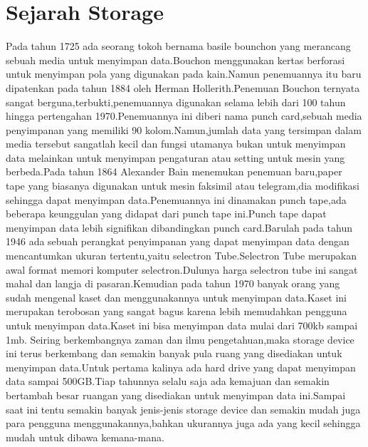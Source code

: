 \section{Sejarah Storage}
Pada tahun 1725 ada seorang tokoh bernama basile bounchon yang merancang sebuah media untuk menyimpan data.Bouchon menggunakan kertas berforasi untuk menyimpan pola yang digunakan pada kain.Namun penemuannya itu baru dipatenkan pada tahun 1884 oleh Herman Hollerith.Penemuan Bouchon ternyata sangat berguna,terbukti,penemuannya digunakan selama lebih dari 100 tahun hingga pertengahan 1970.Penemuannya ini diberi nama punch card,sebuah media penyimpanan yang memiliki 90 kolom.Namun,jumlah data yang tersimpan dalam media tersebut sangatlah kecil dan fungsi utamanya bukan untuk menyimpan data melainkan untuk menyimpan pengaturan atau setting untuk mesin yang berbeda.Pada tahun 1864 Alexander Bain menemukan penemuan baru,paper tape yang biasanya digunakan untuk mesin faksimil atau telegram,dia modifikasi sehingga dapat menyimpan data.Penemuannya ini dinamakan punch tape,ada beberapa keunggulan yang didapat dari punch tape ini.Punch tape dapat menyimpan data lebih signifikan dibandingkan punch card.Barulah pada tahun 1946 ada sebuah perangkat penyimpanan yang dapat menyimpan data dengan mencantumkan ukuran tertentu,yaitu selectron Tube.Selectron Tube merupakan awal format memori komputer selectron.Dulunya harga selectron tube ini sangat mahal dan langja di pasaran.Kemudian pada tahun 1970 banyak orang yang sudah mengenal kaset dan menggunakannya untuk menyimpan data.Kaset ini merupakan terobosan yang sangat bagus karena lebih memudahkan pengguna untuk menyimpan data.Kaset ini bisa menyimpan data mulai dari 700kb sampai 1mb.
Seiring berkembangnya zaman dan ilmu pengetahuan,maka storage device ini terus berkembang dan semakin banyak pula ruang yang disediakan untuk menyimpan  data.Untuk pertama kalinya ada hard drive yang dapat menyimpan data sampai 500GB.Tiap tahunnya selalu saja ada kemajuan dan semakin bertambah besar ruangan yang disediakan untuk menyimpan data ini.Sampai saat ini tentu semakin banyak jenis-jenis storage device dan semakin mudah juga para pengguna menggunakannya,bahkan ukurannya juga ada yang kecil sehingga mudah untuk dibawa kemana-mana.

